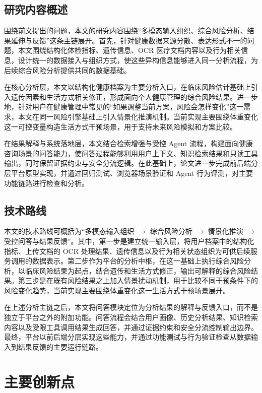 \subsection{研究内容概述}

围绕前文提出的问题，本文的研究内容围绕“多模态输入组织、综合风险分析、结果延伸与反馈”这条主链展开。首先，针对健康数据来源分散、表达形式不一的问题，本文围绕结构化体检指标、遗传信息、OCR 医疗文档内容以及行为相关信息，设计统一的数据接入与组织方式，使这些异构信息能够进入同一分析流程，为后续综合风险分析提供共同的数据基础。

在核心分析层，本文以结构化健康档案为主要分析入口，在临床风险估计基础上引入遗传因素和生活方式相关修正，形成面向个人健康管理的综合风险结果。进一步地，针对用户在健康管理中常见的“如果调整当前方案，风险会怎样变化”这一需求，本文在同一风险引擎基础上引入情景化推演机制。当前实现主要围绕体重变化这一可控变量构造生活方式干预场景，用于支持未来风险模拟和方案比较。

在结果解释与系统落地层，本文结合检索增强与受控 Agent 流程，构建面向健康咨询场景的问答能力，使问答过程能够利用用户上下文、知识检索结果和只读工具输出，同时保留证据约束与安全分流逻辑。在此基础上，论文进一步完成前后端分层平台原型实现，并通过回归测试、浏览器场景验证和 Agent 行为评测，对主要功能链路进行检查和分析。

\subsection{技术路线}

本文的技术路线可概括为“多模态输入组织 $\rightarrow$ 综合风险分析 $\rightarrow$ 情景化推演 $\rightarrow$ 受控问答与结果反馈”。其中，第一步是建立统一输入层，将用户档案中的结构化指标、上传文档的 OCR 处理结果、遗传信息以及行为相关状态组织为可供后续服务调用的数据表示。第二步作为平台的分析中枢，在这一基础上执行综合风险分析，以临床风险结果为起点，结合遗传和生活方式修正，输出可解释的综合风险结果。第三步是在既有风险结果之上加入情景扰动机制，用于比较不同干预条件下的风险变化趋势，当前实现主要围绕体重变化这一生活方式干预场景展开。

在上述分析主链之后，本文将问答模块定位为分析结果的解释与反馈入口，而不是独立于平台之外的附加功能。问答流程会结合用户画像、历史分析结果、知识检索内容以及受限工具调用结果生成回答，并通过证据约束和安全分流控制输出边界。最终，平台以前后端分层实现这些能力，并通过功能测试与行为验证检查从数据输入到结果反馈的主要运行链路。

\section{主要创新点}

